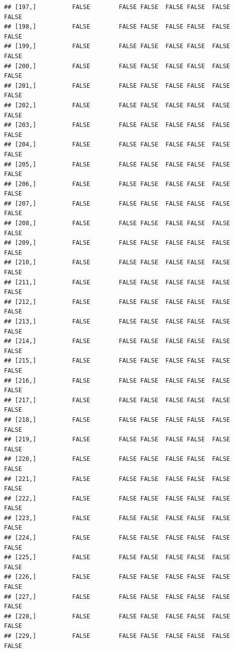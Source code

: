 \documentclass[
  english,
  man,floatsintext]{apa6}
\begin{document}
\begin{verbatim}
## [197,]          FALSE        FALSE FALSE  FALSE FALSE  FALSE            FALSE
## [198,]          FALSE        FALSE FALSE  FALSE FALSE  FALSE            FALSE
## [199,]          FALSE        FALSE FALSE  FALSE FALSE  FALSE            FALSE
## [200,]          FALSE        FALSE FALSE  FALSE FALSE  FALSE            FALSE
## [201,]          FALSE        FALSE FALSE  FALSE FALSE  FALSE            FALSE
## [202,]          FALSE        FALSE FALSE  FALSE FALSE  FALSE            FALSE
## [203,]          FALSE        FALSE FALSE  FALSE FALSE  FALSE            FALSE
## [204,]          FALSE        FALSE FALSE  FALSE FALSE  FALSE            FALSE
## [205,]          FALSE        FALSE FALSE  FALSE FALSE  FALSE            FALSE
## [206,]          FALSE        FALSE FALSE  FALSE FALSE  FALSE            FALSE
## [207,]          FALSE        FALSE FALSE  FALSE FALSE  FALSE            FALSE
## [208,]          FALSE        FALSE FALSE  FALSE FALSE  FALSE            FALSE
## [209,]          FALSE        FALSE FALSE  FALSE FALSE  FALSE            FALSE
## [210,]          FALSE        FALSE FALSE  FALSE FALSE  FALSE            FALSE
## [211,]          FALSE        FALSE FALSE  FALSE FALSE  FALSE            FALSE
## [212,]          FALSE        FALSE FALSE  FALSE FALSE  FALSE            FALSE
## [213,]          FALSE        FALSE FALSE  FALSE FALSE  FALSE            FALSE
## [214,]          FALSE        FALSE FALSE  FALSE FALSE  FALSE            FALSE
## [215,]          FALSE        FALSE FALSE  FALSE FALSE  FALSE            FALSE
## [216,]          FALSE        FALSE FALSE  FALSE FALSE  FALSE            FALSE
## [217,]          FALSE        FALSE FALSE  FALSE FALSE  FALSE            FALSE
## [218,]          FALSE        FALSE FALSE  FALSE FALSE  FALSE            FALSE
## [219,]          FALSE        FALSE FALSE  FALSE FALSE  FALSE            FALSE
## [220,]          FALSE        FALSE FALSE  FALSE FALSE  FALSE            FALSE
## [221,]          FALSE        FALSE FALSE  FALSE FALSE  FALSE            FALSE
## [222,]          FALSE        FALSE FALSE  FALSE FALSE  FALSE            FALSE
## [223,]          FALSE        FALSE FALSE  FALSE FALSE  FALSE            FALSE
## [224,]          FALSE        FALSE FALSE  FALSE FALSE  FALSE            FALSE
## [225,]          FALSE        FALSE FALSE  FALSE FALSE  FALSE            FALSE
## [226,]          FALSE        FALSE FALSE  FALSE FALSE  FALSE            FALSE
## [227,]          FALSE        FALSE FALSE  FALSE FALSE  FALSE            FALSE
## [228,]          FALSE        FALSE FALSE  FALSE FALSE  FALSE            FALSE
## [229,]          FALSE        FALSE FALSE  FALSE FALSE  FALSE            FALSE

\end{verbatim}
\end{document}
